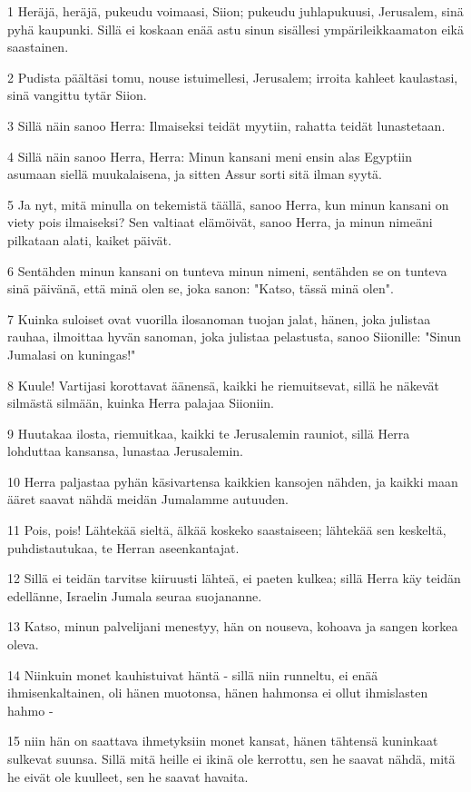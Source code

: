 \par 1 Heräjä, heräjä, pukeudu voimaasi, Siion; pukeudu juhlapukuusi, Jerusalem, sinä pyhä kaupunki. Sillä ei koskaan enää astu sinun sisällesi ympärileikkaamaton eikä saastainen.
\par 2 Pudista päältäsi tomu, nouse istuimellesi, Jerusalem; irroita kahleet kaulastasi, sinä vangittu tytär Siion.
\par 3 Sillä näin sanoo Herra: Ilmaiseksi teidät myytiin, rahatta teidät lunastetaan.
\par 4 Sillä näin sanoo Herra, Herra: Minun kansani meni ensin alas Egyptiin asumaan siellä muukalaisena, ja sitten Assur sorti sitä ilman syytä.
\par 5 Ja nyt, mitä minulla on tekemistä täällä, sanoo Herra, kun minun kansani on viety pois ilmaiseksi? Sen valtiaat elämöivät, sanoo Herra, ja minun nimeäni pilkataan alati, kaiket päivät.
\par 6 Sentähden minun kansani on tunteva minun nimeni, sentähden se on tunteva sinä päivänä, että minä olen se, joka sanon: "Katso, tässä minä olen".
\par 7 Kuinka suloiset ovat vuorilla ilosanoman tuojan jalat, hänen, joka julistaa rauhaa, ilmoittaa hyvän sanoman, joka julistaa pelastusta, sanoo Siionille: "Sinun Jumalasi on kuningas!"
\par 8 Kuule! Vartijasi korottavat äänensä, kaikki he riemuitsevat, sillä he näkevät silmästä silmään, kuinka Herra palajaa Siioniin.
\par 9 Huutakaa ilosta, riemuitkaa, kaikki te Jerusalemin rauniot, sillä Herra lohduttaa kansansa, lunastaa Jerusalemin.
\par 10 Herra paljastaa pyhän käsivartensa kaikkien kansojen nähden, ja kaikki maan ääret saavat nähdä meidän Jumalamme autuuden.
\par 11 Pois, pois! Lähtekää sieltä, älkää koskeko saastaiseen; lähtekää sen keskeltä, puhdistautukaa, te Herran aseenkantajat.
\par 12 Sillä ei teidän tarvitse kiiruusti lähteä, ei paeten kulkea; sillä Herra käy teidän edellänne, Israelin Jumala seuraa suojananne.
\par 13 Katso, minun palvelijani menestyy, hän on nouseva, kohoava ja sangen korkea oleva.
\par 14 Niinkuin monet kauhistuivat häntä - sillä niin runneltu, ei enää ihmisenkaltainen, oli hänen muotonsa, hänen hahmonsa ei ollut ihmislasten hahmo -
\par 15 niin hän on saattava ihmetyksiin monet kansat, hänen tähtensä kuninkaat sulkevat suunsa. Sillä mitä heille ei ikinä ole kerrottu, sen he saavat nähdä, mitä he eivät ole kuulleet, sen he saavat havaita.

